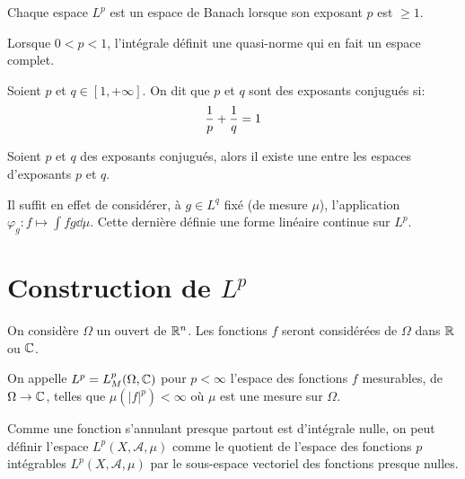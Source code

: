 \medskip
\begin{theoreme}
Chaque espace $L^p$ est un espace de Banach lorsque son exposant $p$ est $\ge 1$.
\end{theoreme}

\begin{theoreme}
Lorsque $0 < p < 1$, l'intégrale définit une quasi-norme qui en fait un espace complet.
\end{theoreme}


\medskip
\begin{definition}
Soient $p$ et $q\in [1,+\infty]$. On dit que $p$ et $q$ sont des exposants conjugués si:
\begin{equation}\colorred\dfrac1p + \dfrac1q = 1 \end{equation}
\end{definition}

\begin{theoreme}
Soient $p$ et $q$ des exposants conjugués, alors il existe une  entre les espaces d'exposants $p$ et $q$.
\end{theoreme}
Il suffit en effet de considérer, à $g\in L^q$ fixé (de mesure $\mu$), l'application $\varphi_g: f\mapsto \int fg\dd\mu$. Cette dernière
définie une forme linéaire continue sur $L^p$.

\medskip
\section{Construction de $L^p$}

On considère $\Omega$ un ouvert de $\mathbb R^n$.
Les fonctions $f$ seront considérées de $\Omega$  dans $\mathbb R$ ou $\mathbb C$.

\medskip
On appelle $\colorblue L^p \colorblack= L^p_M(\Omega,\CC)$ pour $p<\infty$
l'espace des fonctions $f$ mesurables, de $\Omega \rightarrow \mathbb C$, telles que
$\mu(|f|^p)<\infty$ où $\mu$ est une mesure sur $\Omega$.

\medskip
Comme une fonction s'annulant presque partout est d'intégrale nulle, on peut définir
l'espace $L^p(X, \mathcal{A}, \mu)$ comme le quotient de l'espace des fonctions $p$ intégrables
$L^p(X, \mathcal{A}, \mu)$ par le sous-espace vectoriel des fonctions presque nulles.


